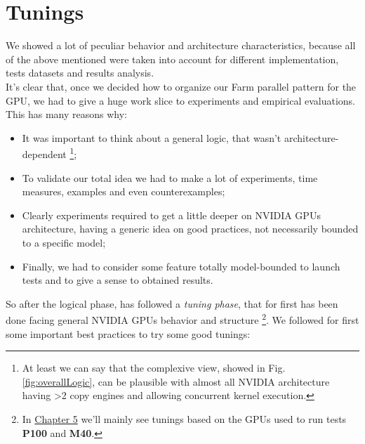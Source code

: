 \section{Tunings}
\label{sect:tunings}
	We showed a lot of peculiar behavior and architecture characteristics, because all of the above mentioned were taken into account for different implementation, tests datasets and results analysis.\\
	It's clear that, once we decided how to organize our Farm parallel pattern for the GPU, we had to give a huge work slice to experiments and empirical evaluations.
	This has many reasons why:
	\begin{itemize}
		\item It was important to think about a general logic, that wasn't architecture-dependent \footnote{At least we can say that the complexive view, showed in Fig. \ref{fig:overallLogic}, can be plausible with almost all NVIDIA architecture having >2 copy engines and allowing concurrent kernel execution. };
		
		\item To validate our total idea we had to make a lot of experiments, time measures, examples and even counterexamples;
		
		\item Clearly experiments required to get a little deeper on NVIDIA GPUs architecture, having a generic idea on good practices, not necessarily bounded to a specific model;
		
		\item Finally, we had to consider some feature totally model-bounded to launch tests and to give a sense to obtained results.
	\end{itemize}
	
	So after the logical phase, has followed a \textit{tuning phase}, that for first has been done facing general NVIDIA GPUs behavior and structure \footnote{In \hyperref[chap:experim]{Chapter 5} we'll mainly see tunings based on the GPUs used to run tests \textendash \textbf{P100} and \textbf{M40}.}.
	We followed for first some important best practices to try some good tunings:

